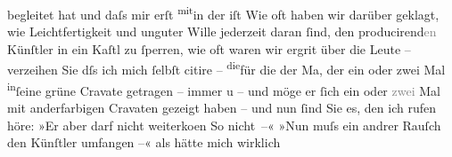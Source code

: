                begleitet hat und daſs  mir erſt \substVorne{}\textsuperscript{mit}\substDazwischen{}in\substHinten{} der \label{T_L02988-2v}\label{T_L02988-2} iſt{\dotstwo} Wie oft haben wir darüber geklagt, wie Leichtfertigkeit
               und unguter Wille jederzeit daran{ }ſind, den producirend\textcolor{gray}{en}{ }{\pb}Künſtler in ein Kaſtl zu{ }ſperren, wie oft
               waren wir ergri{\geminationm}t\strikeout{,} über
               die Leute – verzeihen Sie dſs ich mich{ }ſelbſt citire – \substVorne{}\textsuperscript{die}\substDazwischen{}fü\substHinten{}r die der Ma{\geminationn}, der ein oder zwei Mal \substVorne{}\textsuperscript{in}\substDazwischen{}ſe\substHinten{}ine grüne Cravate getragen – immer u \label{T_L02988-3v}\label{T_L02988-3} – und möge er{ }ſich ein oder
                  \textcolor{gray}{zwei} Mal mit anderfarbigen Cravaten gezeigt haben – und nun{ }ſind Sie es, den {\pb}ich rufen höre: »Er aber
               darf nicht weiterko{\geminationm}en {\dotstwo} So
               nicht –« »Nun muſs ein andrer Rauſch den Künſtler umfangen –« als hätte mich wirklich
